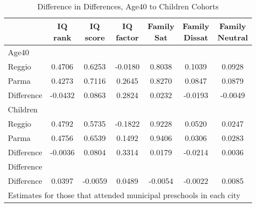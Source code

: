 \begin{table}[htbp]\centering
\caption{Difference in Differences, Age40 to Children Cohorts}
\begin{tabular}{l*{6}{c}}
\hline\hline
            &     IQ rank&    IQ score&   IQ factor&  Family Sat&Family Dissat&Family Neutral\\
\hline
Age40       &            &            &            &            &            &            \\
Reggio      &      0.4706&      0.6253&     -0.0180&      0.8038&      0.1039&      0.0928\\
Parma       &      0.4273&      0.7116&      0.2645&      0.8270&      0.0847&      0.0879\\
Difference  &     -0.0432&      0.0863&      0.2824&      0.0232&     -0.0193&     -0.0049\\
\hline
Children    &            &            &            &            &            &            \\
Reggio      &      0.4792&      0.5735&     -0.1822&      0.9228&      0.0520&      0.0247\\
Parma       &      0.4756&      0.6539&      0.1492&      0.9406&      0.0306&      0.0283\\
Difference  &     -0.0036&      0.0804&      0.3314&      0.0179&     -0.0214&      0.0036\\
\hline
Difference  &            &            &            &            &            &            \\
Difference  &      0.0397&     -0.0059&      0.0489&     -0.0054&     -0.0022&      0.0085\\
\hline\hline
\multicolumn{7}{l}{\footnotesize Estimates for those that attended municipal preschools in each city}\\
\end{tabular}
\end{table}
